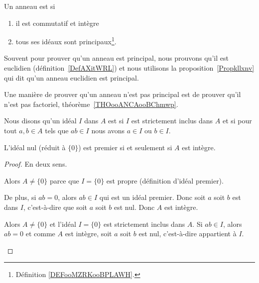 \begin{definition}          \label{DEFooGWOZooXzUlhK}
	Un anneau est  si
	\begin{enumerate}
		\item
		      il est commutatif et intègre
		\item
		      tous ses idéaux sont principaux\footnote{Définition \ref{DEFooMZRKooBPLAWH}.}.
	\end{enumerate}
\end{definition}

Souvent pour prouver qu'un anneau est principal, nous prouvons qu'il est euclidien (définition~\ref{DefAXitWRL}) et nous utilisons la proposition~\ref{Propkllxnv} qui dit qu'un anneau euclidien est principal.

Une manière de prouver qu'un anneau n'est pas principal est de prouver qu'il n'est pas factoriel, théorème~\ref{THOooANCAooBChmwp}.

\begin{definition}      \label{DEFooAQSZooVhvQWv}
	Nous disons qu'un idéal \( I\) dans \( A\) est  si \( I\) est strictement inclus dans \( A\) et si pour tout \( a,b\in A\) tels que \( ab\in I\) nous avons \( a\in I\) ou \( b\in I\).
\end{definition}

\begin{lemma}       \label{LEMooYRPBooYxXXsi}
	L'idéal nul (réduit à \( \{ 0 \}\)) est premier si et seulement si \( A\) est intègre.
\end{lemma}

\begin{proof}
	En deux sens.
	\begin{subproof}
		Alors \( A\neq \{ 0 \}\) parce que \( I=\{ 0 \}\) est propre (définition d'idéal premier).

		De plus, si \( ab=0\), alors \( ab\in I\) qui est un idéal premier. Donc soit \( a\) soit \( b\) est dans \( I\), c'est-à-dire que soit \( a\) soit \( b\) est nul. Donc \( A\) est intègre.

		Alors \( A\neq \{ 0 \}\) et l'idéal \( I=\{ 0 \}\) est strictement inclus dans \( A\). Si \( ab\in I\), alors \( ab=0\) et comme \( A\) est intègre, soit \( a\) soit \( b\) est nul, c'est-à-dire appartient à \( I\).
	\end{subproof}
\end{proof}


